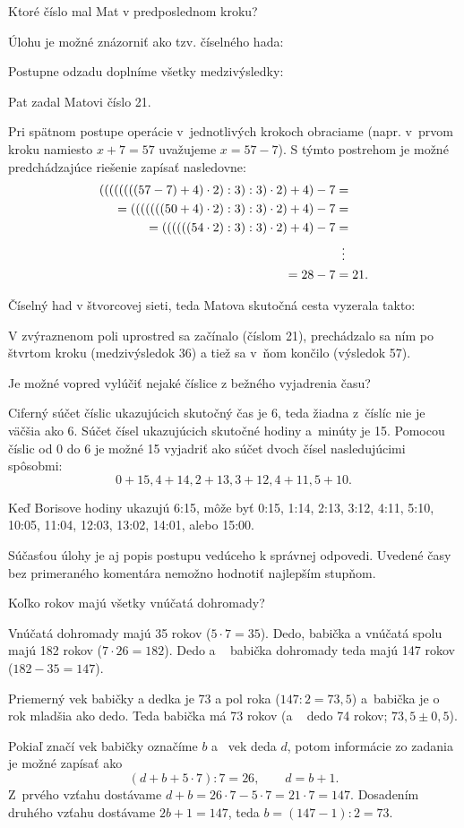 {%
\napad
Ktoré číslo mal Mat v predposlednom kroku?

\riesenie
Úlohu je možné znázorniť ako tzv. číselného hada:
%

Postupne odzadu doplníme všetky medzivýsledky:
%

Pat zadal Matovi číslo 21.

\poznamky
Pri spätnom postupe operácie v~jednotlivých krokoch obraciame
(napr. v~prvom kroku namiesto $x+7=57$ uvažujeme $x=57-7$).
S týmto postrehom je možné predchádzajúce riešenie zapísať nasledovne:
$$
\aligned
((((((((57-7)+4)\cdot2):3):3)\cdot2)+4)-7 &= \\
= (((((((50+4)\cdot2):3):3)\cdot2)+4)-7 &= \\
= ((((((54\cdot2):3):3)\cdot2)+4)-7 &= \\
& \hskip5pt \vdots \\
= 28-7 &=21.
\endaligned
$$

Číselný had v štvorcovej sieti, teda Matova skutočná cesta vyzerala takto:
%

V zvýraznenom poli uprostred sa začínalo (číslom 21), prechádzalo sa ním po štvrtom kroku (medzivýsledok 36) a tiež sa v~ňom končilo (výsledok 57).
}

{%
\napad
Je možné vopred vylúčiť nejaké číslice z bežného vyjadrenia času?

\res
Ciferný súčet číslic ukazujúcich skutočný čas je 6, teda žiadna z~číslíc nie je väčšia ako 6.
Súčet čísel ukazujúcich skutočné hodiny a~minúty je 15.
Pomocou číslic od 0 do 6 je možné 15 vyjadriť ako súčet dvoch čísel nasledujúcimi spôsobmi:
$$
0+15, 4+14, 2+13, 3+12, 4+11, 5+10.
$$

Keď Borisove hodiny ukazujú 6:15, môže byť 0:15, 1:14, 2:13, 3:12, 4:11, 5:10, 10:05, 11:04, 12:03, 13:02, 14:01, alebo 15:00.

\poznamka
Súčasťou úlohy je aj popis postupu vedúceho k správnej odpovedi.
Uvedené časy bez primeraného komentára nemožno hodnotiť najlepším stupňom.}

{%
\napad
Koľko rokov majú všetky vnúčatá dohromady?

\res
Vnúčatá dohromady majú 35 rokov ($5\cdot7=35$).
Dedo, babička a vnúčatá spolu majú 182 rokov ($7\cdot26=182$).
Dedo a ~ babička dohromady teda majú 147 rokov ($182-35=147$).

Priemerný vek babičky a dedka je 73 a pol roka ($147:2=73{,}5$) a~babička je o rok mladšia ako dedo.
Teda babička má 73 rokov (a ~ dedo 74 rokov; $73{,}5\pm0{,}5$).

\poznamka
Pokiaľ značí vek babičky označíme $b$ a~ vek deda $d$, potom informácie zo zadania je možné zapísať ako
$$
(d+b+5\cdot7): 7=26, \qquad d=b+1.
$$
Z~prvého vzťahu dostávame $d+b=26\cdot7-5\cdot7=21\cdot7=147$.
Dosadením druhého vzťahu dostávame $2b+1=147$, teda $b=(147-1):2=73$.}

